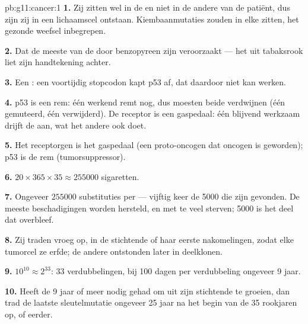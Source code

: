 \begin{solution}{pb:g11:cancer:1}
\textbf{1.} Zij zitten wel in de  en niet in de andere  van de
patiënt, dus zijn zij in een lichaamscel ontstaan. Kiembaanmutaties zouden
in elke  zitten, het gezonde weefsel inbegrepen.

\textbf{2.} Dat de meeste  van de  door benzopyreen zijn
veroorzaakt --- het  uit tabaksrook liet zijn handtekening achter.

\textbf{3.} Een : een voortijdig stopcodon kapt p53 af,
dat daardoor niet kan werken.

\textbf{4.} p53 is een rem: één werkend  remt nog, dus moesten beide
verdwijnen (één gemuteerd, één verwijderd). De receptor is een gaspedaal:
één blijvend werkzaam  drijft de  aan, wat het andere  ook
doet.

\textbf{5.} Het receptorgen is het gaspedaal (een proto-oncogen dat
oncogen is geworden); p53 is de rem (tumorsuppressor).

\textbf{6.} $20 \times 365 \times 35 \approx \num{255000}$ sigaretten.

\textbf{7.} Ongeveer $\num{255000}$ substituties per  --- vijftig keer
de 5000 die zijn gevonden. De meeste beschadigingen worden hersteld, en
 met te veel  sterven; 5000 is het deel dat overbleef.

\textbf{8.} Zij traden vroeg op, in de stichtende  of haar eerste
nakomelingen, zodat elke tumorcel ze erfde; de andere ontstonden later in
deelklonen.

\textbf{9.} $10^{10} \approx 2^{33}$: 33 verdubbelingen, bij 100 dagen per
verdubbeling ongeveer 9 jaar.

\textbf{10.} Heeft de  9 jaar of meer nodig gehad om uit zijn
stichtende  te groeien, dan trad de laatste sleutelmutatie ongeveer 25
jaar na het begin van de 35 rookjaren op, of eerder.


\end{solution}
